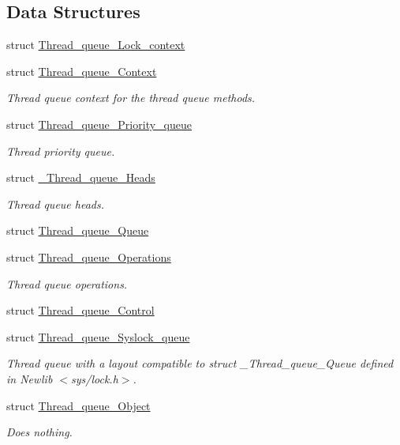 \subsection*{Data Structures}
\begin{DoxyCompactItemize}
\item 
struct \mbox{\hyperlink{structThread__queue__Lock__context}{Thread\+\_\+queue\+\_\+\+Lock\+\_\+context}}
\item 
struct \mbox{\hyperlink{structThread__queue__Context}{Thread\+\_\+queue\+\_\+\+Context}}
\begin{DoxyCompactList}\small\item\em Thread queue context for the thread queue methods. \end{DoxyCompactList}\item 
struct \mbox{\hyperlink{structThread__queue__Priority__queue}{Thread\+\_\+queue\+\_\+\+Priority\+\_\+queue}}
\begin{DoxyCompactList}\small\item\em Thread priority queue. \end{DoxyCompactList}\item 
struct \mbox{\hyperlink{struct__Thread__queue__Heads}{\+\_\+\+Thread\+\_\+queue\+\_\+\+Heads}}
\begin{DoxyCompactList}\small\item\em Thread queue heads. \end{DoxyCompactList}\item 
struct \mbox{\hyperlink{structThread__queue__Queue}{Thread\+\_\+queue\+\_\+\+Queue}}
\item 
struct \mbox{\hyperlink{structThread__queue__Operations}{Thread\+\_\+queue\+\_\+\+Operations}}
\begin{DoxyCompactList}\small\item\em Thread queue operations. \end{DoxyCompactList}\item 
struct \mbox{\hyperlink{structThread__queue__Control}{Thread\+\_\+queue\+\_\+\+Control}}
\item 
struct \mbox{\hyperlink{structThread__queue__Syslock__queue}{Thread\+\_\+queue\+\_\+\+Syslock\+\_\+queue}}
\begin{DoxyCompactList}\small\item\em Thread queue with a layout compatible to struct \+\_\+\+Thread\+\_\+queue\+\_\+\+Queue defined in Newlib $<$sys/lock.\+h$>$. \end{DoxyCompactList}\item 
struct \mbox{\hyperlink{structThread__queue__Object}{Thread\+\_\+queue\+\_\+\+Object}}
\begin{DoxyCompactList}\small\item\em Does nothing. \end{DoxyCompactList}\end{DoxyCompactItemize}
